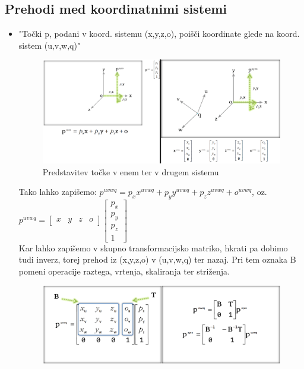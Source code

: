 \documentclass{article}
\begin{document}
\subsection{Prehodi med koordinatnimi sistemi}
\begin{itemize}
    \item "Točki p, podani v koord. sistemu (x,y,z,o), poišči koordinate glede na koord. sistem (u,v,w,q)"
        \begin{figure}[H]
        \centering
        \includegraphics[width=150mm]{src/prehajanje_koord_sistemov_1.png}
        \caption{Predstavitev točke v enem ter v drugem sistemu}
        \end{figure} 
    Tako lahko zapišemo: $p^{uvwq} = p_xx^{uvwq} + p_yy^{uvwq} + p_zz^{uvwq} + o^{uvwq}$, oz. $p^{uvwq} = \begin{bmatrix} x & y & z & o \end{bmatrix} \begin{bmatrix} p_x \\ p_y \\ p_z \\ 1 \end{bmatrix}$ \\
    Kar lahko zapišemo v skupno transformacijsko matriko, hkrati pa dobimo tudi inverz, torej prehod iz (x,y,z,o) v (u,v,w,q) ter nazaj. Pri tem oznaka B pomeni operacije raztega, vrtenja, skaliranja ter striženja.
        \begin{figure}[H]
        \centering
        \includegraphics[width=150mm]{src/prehajanje_koord_sistemov_2.png}
        \end{figure} 
\end{itemize}
\end{document}
